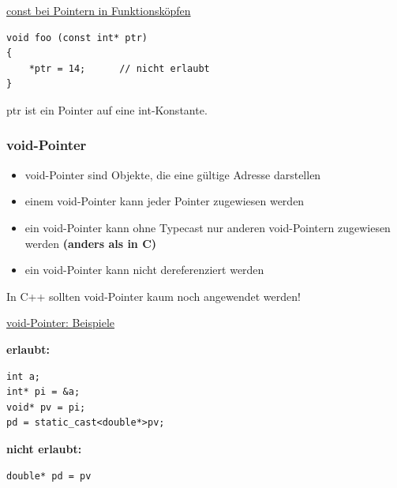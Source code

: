 \underline{const bei Pointern in Funktionsköpfen}\\
\noindent
\begin{minipage}{0.45\linewidth}
\vspace{-\baselineskip}
\begin{lstlisting}
void foo (const int* ptr)
{
	*ptr = 14;		// nicht erlaubt
}
\end{lstlisting}
\end{minipage}
\hspace{0.01\linewidth}
\begin{minipage}{0.5\linewidth}
ptr ist ein Pointer auf eine int-Konstante.
\vfill\null
\end{minipage}

\subsubsection{void-Pointer}
\begin{itemize}
	\item void-Pointer sind Objekte, die eine gültige Adresse darstellen
	\item einem void-Pointer kann jeder Pointer zugewiesen werden
	\item ein void-Pointer kann ohne Typecast nur anderen void-Pointern zugewiesen werden \textbf{(anders als in C)}
	\item ein void-Pointer kann nicht dereferenziert werden
\end{itemize}
\begin{hinweis}
In C++ sollten void-Pointer kaum noch angewendet werden!
\end{hinweis}
\underline{void-Pointer: Beispiele}\\
\noindent
\begin{minipage}{0.4\linewidth}
\textbf{erlaubt:}
\vspace{-\baselineskip}
\begin{lstlisting}
int a;
int* pi = &a;
void* pv = pi;
pd = static_cast<double*>pv;
\end{lstlisting}
\vfill\null
\end{minipage}
\hspace{0.01\linewidth}
\begin{minipage}{0.2\linewidth}
\textbf{nicht erlaubt:}
\vspace{-\baselineskip}
\begin{lstlisting}
double* pd = pv	
\end{lstlisting}
\vfill\null
\end{minipage}

